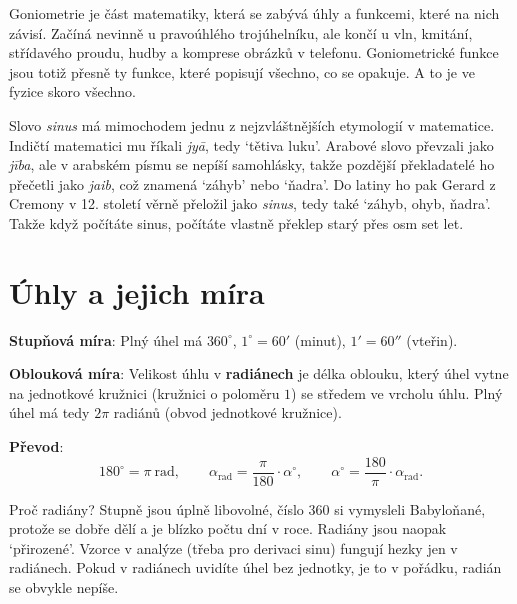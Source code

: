 \label{kap:goniometrie}

Goniometrie je část matematiky, která se zabývá úhly a funkcemi, které na nich závisí. Začíná nevinně u pravoúhlého trojúhelníku, ale končí u vln, kmitání, střídavého proudu, hudby a komprese obrázků v telefonu. Goniometrické funkce jsou totiž přesně ty funkce, které popisují všechno, co se opakuje. A to je ve fyzice skoro všechno.

\begin{note}
  Slovo \textit{sinus} má mimochodem jednu z nejzvláštnějších etymologií v matematice. Indičtí matematici mu říkali \textit{jyā}, tedy `tětiva luku'. Arabové slovo převzali jako \textit{jība}, ale v arabském písmu se nepíší samohlásky, takže pozdější překladatelé ho přečetli jako \textit{jaib}, což znamená `záhyb' nebo `ňadra'. Do latiny ho pak Gerard z Cremony v 12. století věrně přeložil jako \textit{sinus}, tedy také `záhyb, ohyb, ňadra'. Takže když počítáte sinus, počítáte vlastně překlep starý přes osm set let.
\end{note}

\section{Úhly a jejich míra}\label{sec:mira-uhlu}

\begin{definitionbox}
  \textbf{Stupňová míra}: Plný úhel má $360^\circ$, $1^\circ = 60'$ (minut), $1' = 60''$ (vteřin).

  \textbf{Oblouková míra}: Velikost úhlu v \textbf{radiánech} je délka oblouku, který úhel vytne na jednotkové kružnici (kružnici o poloměru $1$) se středem ve vrcholu úhlu. Plný úhel má tedy $2\pi$ radiánů (obvod jednotkové kružnice).

  \textbf{Převod}:
  \begin{equation*}
    180^\circ = \pi\ \text{rad},\qquad\alpha_{\text{rad}} = \frac{\pi}{180}\cdot\alpha^\circ,\qquad\alpha^\circ = \frac{180}{\pi}\cdot\alpha_{\text{rad}}.
  \end{equation*}
\end{definitionbox}

Proč radiány? Stupně jsou úplně libovolné, číslo $360$ si vymysleli Babyloňané, protože se dobře dělí a je blízko počtu dní v roce. Radiány jsou naopak `přirozené'. Vzorce v analýze (třeba pro derivaci sinu) fungují hezky jen v radiánech. Pokud v radiánech uvidíte úhel bez jednotky, je to v pořádku, radián se obvykle nepíše.

